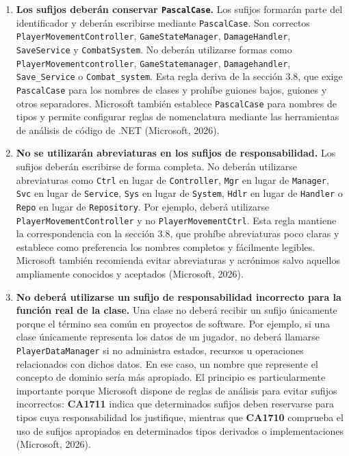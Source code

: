 \begin{enumerate}
\item \textbf{Los sufijos deberán conservar \texttt{PascalCase}.} Los sufijos formarán parte del identificador y deberán escribirse mediante \texttt{PascalCase}. Son correctos \texttt{PlayerMovementController}, \texttt{GameStateManager}, \texttt{DamageHandler}, \texttt{SaveService} y \texttt{CombatSystem}. No deberán utilizarse formas como \texttt{PlayerMovementcontroller}, \texttt{GameStatemanager}, \texttt{Damagehandler}, \texttt{Save\_Service} o \texttt{Combat\_system}. Esta regla deriva de la sección 3.8, que exige \texttt{PascalCase} para los nombres de clases y prohíbe guiones bajos, guiones y otros separadores. Microsoft también establece \texttt{PascalCase} para nombres de tipos y permite configurar reglas de nomenclatura mediante las herramientas de análisis de código de .NET (Microsoft, 2026).

\item \textbf{No se utilizarán abreviaturas en los sufijos de responsabilidad.} Los sufijos deberán escribirse de forma completa. No deberán utilizarse abreviaturas como \texttt{Ctrl} en lugar de \texttt{Controller}, \texttt{Mgr} en lugar de \texttt{Manager}, \texttt{Svc} en lugar de \texttt{Service}, \texttt{Sys} en lugar de \texttt{System}, \texttt{Hdlr} en lugar de \texttt{Handler} o \texttt{Repo} en lugar de \texttt{Repository}. Por ejemplo, deberá utilizarse \texttt{PlayerMovementController} y no \texttt{PlayerMovementCtrl}. Esta regla mantiene la correspondencia con la sección 3.8, que prohíbe abreviaturas poco claras y establece como preferencia los nombres completos y fácilmente legibles. Microsoft también recomienda evitar abreviaturas y acrónimos salvo aquellos ampliamente conocidos y aceptados (Microsoft, 2026).

\item \textbf{No deberá utilizarse un sufijo de responsabilidad incorrecto para la función real de la clase.} Una clase no deberá recibir un sufijo únicamente porque el término sea común en proyectos de software. Por ejemplo, si una clase únicamente representa los datos de un jugador, no deberá llamarse \texttt{PlayerDataManager} si no administra estados, recursos u operaciones relacionados con dichos datos. En ese caso, un nombre que represente el concepto de dominio sería más apropiado. El principio es particularmente importante porque Microsoft dispone de reglas de análisis para evitar sufijos incorrectos: \textbf{CA1711} indica que determinados sufijos deben reservarse para tipos cuya responsabilidad los justifique, mientras que \textbf{CA1710} comprueba el uso de sufijos apropiados en determinados tipos derivados o implementaciones (Microsoft, 2026).


\end{enumerate}
